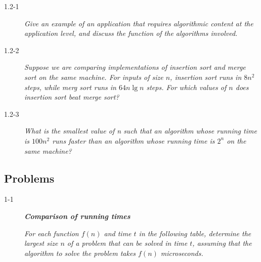 \begin{description}
  \item[1.2-1] {\itshape Give an example of an application that requires algorithmic content at the application level, and discuss the function of the algorithms involved.}

    \begin{exrev}
      
    \end{exrev}

  \item[1.2-2] {\itshape Suppose we are comparing implementations of insertion sort and merge sort on the same machine. For inputs of size $n$, insertion sort runs in $8n^2$ steps, while merg sort runs in $64n\lg n$ steps. For which values of $n$ does insertion sort beat merge sort?}

    \begin{exrev}
      
    \end{exrev}

  \item[1.2-3] {\itshape What is the smallest value of n such that an algorithm whose running time is $100n^2$ runs faster than an algorithm whose running time is $2^n$ on the same machine?}

    \begin{exrev}
      
    \end{exrev}  

\end{description}

\subsection{Problems} 

\begin{description}
  \item[1-1] \textbf{\itshape Comparison of running times}

    {\itshape For each function $f(n)$ and time $t$ in the following table, determine the largest size $n$ of a problem that can be solved in time $t$, assuming that the algorithm to solve the problem takes $f(n)$ microseconds.}

    \begin{pbrev}
      
    \end{pbrev}


\end{description}

